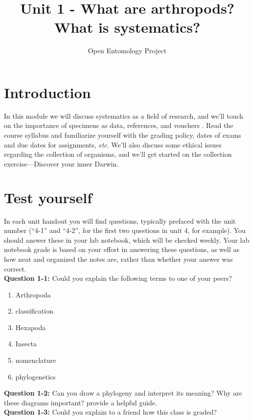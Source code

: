 \documentclass[11pt,letterpaper]{article}
\title{Unit 1 - What are arthropods? What is systematics?}
\author{Open Entomology Project}
\begin{document}
\cleanlookdateon %
\maketitle
\thispagestyle{fancy}
\section*{Introduction}
In this module we will discuss systematics as a field of research, and we'll touch on the importance of specimens as data, references, and vouchers \citep{vouchers}. Read the course syllabus and familiarize yourself with the grading policy, dates of exams and due dates for assignments, \textit{etc}. We'll also discuss some ethical issues regarding the collection of organisms, and we'll get started on the collection exercise---Discover your inner Darwin.

\section*{Test yourself}
In each unit handout you will find questions, typically prefaced with the unit number (``4-1'' and ``4-2'', for the first two questions in unit 4, for example). You should answer these in your lab notebook, which will be checked weekly. Your lab notebook grade is based on your effort in answering these questions, as well as how neat and organized the notes are, rather than whether your answer was correct.\\

\noindent\textbf{Question 1-1:} Could you explain the following terms to one of your peers?
\begin{enumerate} 
\item Arthropoda
\item classification
\item Hexapoda
\item Insecta
\item nomenclature
\item phylogenetics 
\end{enumerate}

\noindent{}\textbf{Question 1-2:} Can you draw a phylogeny and interpret its meaning? Why are these diagrams important? \cite{baum2008phylogenics} provide a helpful guide.\\

\noindent{}\textbf{Question 1-3:} Could you explain to a friend how this class is graded?\\
\end{document}
